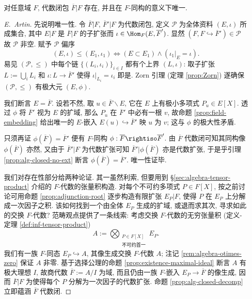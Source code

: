 \begin{theorem}[E.\ Steinitz]\label{prop:alg-closure}
	对任意域 $F$, 代数闭包 $\overline{F}|F$ 存在, 并且在 $F$-同构的意义下唯一.
\end{theorem}
\begin{proof}[E.\ Artin]
	先说明唯一性. 令 $\overline{F}|F$, $\overline{F}'|F$ 为代数闭包, 定义 $\mathcal{P}$ 为全体资料 $(E, \iota)$ 所成集合, 其中 $E|F$ 是 $\overline{F}|F$ 的子扩张而 $\iota \in \Hom_F(E, \overline{F}')$. 显然 $\left( F, F \hookrightarrow \overline{F}' \right) \in \mathcal{P}$ 故 $\mathcal{P}$ 非空. 赋予 $\mathcal{P}$ 偏序
	\[ (E, \iota) \leq (E_1, \iota_1) \iff (E \subset E_1) \wedge (\iota_1|_E = \iota). \]
	易见 $(\mathcal{P}, \leq)$ 中每个链 $\{ (L_i, \iota_i)\}_{i \in I}$ 都有个上界 $(L, \iota)$: 取子扩张 $L := \bigcup_i L_i$ 和 $\iota: L \to \overline{F}'$ 使得 $\iota|_{L_i} = \iota_i$ 即是. Zorn 引理 (定理 \ref{prop:Zorn}) 遂确保 $(\mathcal{P}, \leq)$ 有极大元 $(E, \phi)$.
	
	我们断言 $E=\overline{F}$. 设若不然, 取 $u \in \overline{F} \smallsetminus E$, 它在 $E$ 上有极小多项式 $P_u \in E[X]$. 透过 $\phi$ 将 $\overline{F}'$ 视为 $E$ 的扩域, 那么 $P_u$ 在 $\overline{F}'$ 中必有一根 $v$, 故命题 \ref{prop:field-embedding} 给出唯一的 $E$-嵌入 $E(u) \hookrightarrow \overline{F}'$ 映 $u$ 为 $v$; 这与 $\phi$ 的极大性矛盾.
	
	只须再证 $\phi(\overline{F})=\overline{F}'$ 便有 $F$-同构 $\phi: \overline{F} \rightiso \overline{F}'$. 由 $\overline{F}$ 代数闭可知其同构像 $\phi(\overline{F})$ 亦然, 又由于 $\overline{F}'|F$ 为代数扩张可知 $\overline{F}'|\phi(\overline{F})$ 亦是代数扩张, 于是乎引理 \ref{prop:alg-closed-no-ext} 断言 $\phi(\overline{F})=\overline{F}'$. 唯一性证毕.
	
	我们对存在性部分给两种论证. 其一虽然利索, 但要用到 \S\ref{sec:algebra-tensor-product} 介绍的 $F$-代数的张量积构造. 对每个不可约多项式 $P \in F[X]$, 按之前讨论可用命题 \ref{prop:adjunction-root} 逐步构造有限扩张 $E_P|F$, 使得 $P$ 在 $E_P$ 上分解成一次因子之积. 该如何找到一个由全体 $E_P$ 生成的扩域, 或退而求其次, 寻求如此的交换 $F$-代数? 范畴观点提供了一条线索: 考虑交换 $F$-代数的无穷张量积 (定义-定理 \ref{def:inf-tensor-product})
	\[ A := \bigotimes_{\substack{P \in F[X] \\ \text{不可约首一} }} E_P. \]
	我们有一族 $F$-同态 $E_P \hookrightarrow A$, 其像生成交换 $F$-代数 $A$; 注记 \ref{rem:algebra-otimes-zero} 保证 $A$ 非零. 基于选择公理的命题 \ref{prop:existence-maximal-ideal} 断言 $A$ 有极大理想 $I$, 故商代数 $\overline{F} := A/I$ 为域, 而且仍由一族 $F$-嵌入 $E_P \to \overline{F}$ 的像生成, 因而 $\overline{F}|F$ 为使得每个 $P$ 分解为一次因子的代数扩张. 命题 \ref{prop:alg-closed-decomp} 立即蕴涵 $\overline{F}$ 代数闭.
	

\end{proof}
